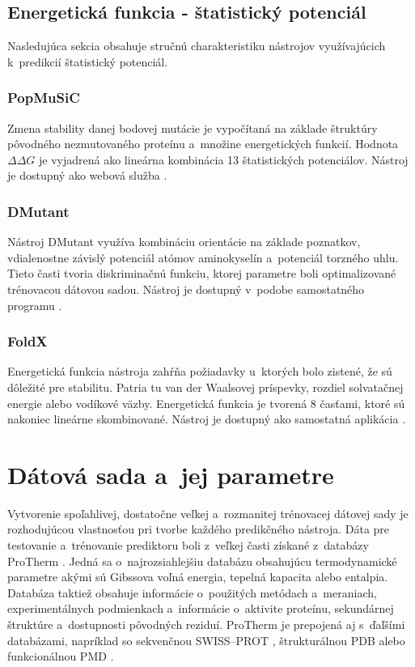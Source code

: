 \section{Energetická funkcia - štatistický potenciál}

Nasledujúca sekcia obsahuje stručnú charakteristiku nástrojov využívajúcich k~predikcií štatistický potenciál.

\subsection{PopMuSiC}

Zmena stability danej bodovej mutácie je vypočítaná na základe štruktúry pôvodného nezmutovaného proteínu a~množine energetických funkcií. Hodnota $\Delta\Delta G$ je vyjadrená ako lineárna kombinácia 13 štatistických potenciálov. Nástroj je dostupný ako webová služba \cite{popmusic}.


\subsection{DMutant}

Nástroj DMutant využíva kombináciu orientácie na základe poznatkov, vdialenostne závislý potenciál atómov aminokyselín a~potenciál torzného uhlu. Tieto časti tvoria diskriminačnú funkciu, ktorej parametre boli optimalizované trénovacou dátovou sadou. Nástroj je dostupný v~podobe samostatného programu \cite{dmutant}.

\subsection{FoldX}

Energetická funkcia nástroja zahŕňa požiadavky u~ktorých bolo zistené, že sú dôležité pre stabilitu. Patria tu van der Waalsovej príspevky, rozdiel solvatačnej energie alebo vodíkové väzby. Energetická funkcia je tvorená 8 časťami, ktoré sú nakoniec lineárne skombinované. Nástroj je dostupný ako samostatná aplikácia \cite{foldx}.


\chapter{Dátová sada a~jej parametre}

Vytvorenie spoľahlivej, dostatočne veľkej a~rozmanitej trénovacej dátovej sady je rozhodujúcou vlastnosťou pri tvorbe každého predikčného nástroja. Dáta pre testovanie a~trénovanie prediktoru boli z~veľkej časti získané z~databázy ProTherm \cite{protherm}. Jedná sa o~najrozsiahlejšiu databázu obsahujúcu termodynamické parametre akými sú Gibssova voľná energia, tepelná kapacita alebo entalpia. Databáza taktiež obsahuje informácie o~použitých metódach a~meraniach, experimentálnych podmienkach a~informácie o~aktivite proteínu, sekundárnej štruktúre a~dostupnosti pôvodných reziduí. ProTherm je prepojená aj s~ďaľšími databázami, napríklad so sekvenčnou SWISS--PROT \cite{swissprot}, štrukturálnou PDB \cite{pdb} alebo funkcionálnou PMD \cite{pmd}.


